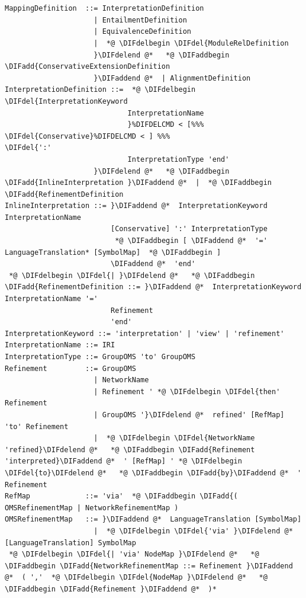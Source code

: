\documentclass[10pt,fleqn,final]{scrreprt}
\providecommand{\DIFadd}[1]{{\protect\color{blue}\uwave{#1}}} %
\providecommand{\DIFdel}[1]{{\protect\color{red}\sout{#1}}}                      %
\providecommand{\DIFaddbegin}{} %
\providecommand{\DIFaddend}{} %
\providecommand{\DIFdelbegin}{} %
\providecommand{\DIFdelend}{} %
\begin{document}
\vspace{-2em}
 \begin{lstlisting}[language=ebnf,mathescape]
  

MappingDefinition  ::= InterpretationDefinition
                     | EntailmentDefinition
                     | EquivalenceDefinition
                     |  *@ \DIFdelbegin \DIFdel{ModuleRelDefinition
                     }\DIFdelend @*   *@ \DIFaddbegin \DIFadd{ConservativeExtensionDefinition
                     }\DIFaddend @*  | AlignmentDefinition
InterpretationDefinition ::=  *@ \DIFdelbegin \DIFdel{InterpretationKeyword
                             InterpretationName
                             }%DIFDELCMD < [%%%
\DIFdel{Conservative}%DIFDELCMD < ] %%%
\DIFdel{':'
                             InterpretationType 'end'
                     }\DIFdelend @*   *@ \DIFaddbegin \DIFadd{InlineInterpretation }\DIFaddend @*  |  *@ \DIFaddbegin \DIFadd{RefinementDefinition
InlineInterpretation ::= }\DIFaddend @*  InterpretationKeyword InterpretationName
                         [Conservative] ':' InterpretationType
                          *@ \DIFaddbegin [ \DIFaddend @*  '=' LanguageTranslation* [SymbolMap]  *@ \DIFaddbegin ]
                         \DIFaddend @*  'end'
 *@ \DIFdelbegin \DIFdel{| }\DIFdelend @*   *@ \DIFaddbegin \DIFadd{RefinementDefinition ::= }\DIFaddend @*  InterpretationKeyword InterpretationName '='
                         Refinement
                         'end'
InterpretationKeyword ::= 'interpretation' | 'view' | 'refinement'
InterpretationName ::= IRI
InterpretationType ::= GroupOMS 'to' GroupOMS
Refinement         ::= GroupOMS
                     | NetworkName
                     | Refinement ' *@ \DIFdelbegin \DIFdel{then' Refinement
                     | GroupOMS '}\DIFdelend @*  refined' [RefMap] 'to' Refinement
                     |  *@ \DIFdelbegin \DIFdel{NetworkName 'refined}\DIFdelend @*   *@ \DIFaddbegin \DIFadd{Refinement 'interpreted}\DIFaddend @*  ' [RefMap] ' *@ \DIFdelbegin \DIFdel{to}\DIFdelend @*   *@ \DIFaddbegin \DIFadd{by}\DIFaddend @*  ' Refinement
RefMap             ::= 'via'  *@ \DIFaddbegin \DIFadd{( OMSRefinementMap | NetworkRefinementMap )
OMSRefinementMap   ::= }\DIFaddend @*  LanguageTranslation [SymbolMap]
                     |  *@ \DIFdelbegin \DIFdel{'via' }\DIFdelend @*  [LanguageTranslation] SymbolMap
 *@ \DIFdelbegin \DIFdel{| 'via' NodeMap }\DIFdelend @*   *@ \DIFaddbegin \DIFadd{NetworkRefinementMap ::= Refinement }\DIFaddend @*  ( ','  *@ \DIFdelbegin \DIFdel{NodeMap }\DIFdelend @*   *@ \DIFaddbegin \DIFadd{Refinement }\DIFaddend @*  )*

\end{lstlisting}
\end{document}
